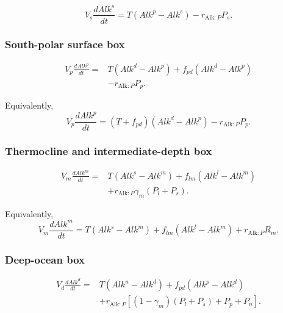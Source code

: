 \documentclass[11pt]{article}
\begin{document}
\begin{equation}
V_s\frac{dAlk^s}{dt}
=
T\left(Alk^p-Alk^s\right)
-
r_{\mathrm{Alk}:P}P_s.
\label{eq:six_alk_s}
\end{equation}

\subsubsection{South-polar surface box}

\begin{equation}
\begin{split}
V_p\frac{dAlk^p}{dt}
={}&
T\left(Alk^d-Alk^p\right)
+
f_{pd}\left(Alk^d-Alk^p\right)
\\
&-
r_{\mathrm{Alk}:P}P_p.
\end{split}
\label{eq:six_alk_p}
\end{equation}

Equivalently,
\begin{equation}
V_p\frac{dAlk^p}{dt}
=
\left(T+f_{pd}\right)
\left(Alk^d-Alk^p\right)
-
r_{\mathrm{Alk}:P}P_p.
\label{eq:six_alk_p_compact}
\end{equation}

\subsubsection{Thermocline and intermediate-depth box}

\begin{equation}
\begin{split}
V_m\frac{dAlk^m}{dt}
={}&
T\left(Alk^s-Alk^m\right)
+
f_{lm}\left(Alk^l-Alk^m\right)
\\
&+
r_{\mathrm{Alk}:P}
\gamma_m\left(P_l+P_s\right).
\end{split}
\label{eq:six_alk_m}
\end{equation}

Equivalently,
\begin{equation}
V_m\frac{dAlk^m}{dt}
=
T\left(Alk^s-Alk^m\right)
+
f_{lm}\left(Alk^l-Alk^m\right)
+
r_{\mathrm{Alk}:P}R_m.
\label{eq:six_alk_m_compact}
\end{equation}

\subsubsection{Deep-ocean box}

\begin{equation}
\begin{split}
V_d\frac{dAlk^d}{dt}
={}&
T\left(Alk^n-Alk^d\right)
+
f_{pd}\left(Alk^p-Alk^d\right)
\\
&+
r_{\mathrm{Alk}:P}
\left[
\left(1-\gamma_m\right)
\left(P_l+P_s\right)
+
P_p+P_n
\right].
\end{split}
\label{eq:six_alk_d}
\end{equation}
\end{document}
